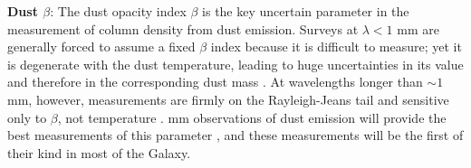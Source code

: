 \documentclass[11pt,preprint]{aastex_nofoot}
\begin{document}

\textbf{Dust $\beta$}:
The dust opacity index $\beta$ is the key uncertain parameter in the
measurement of column density from dust emission.  Surveys at $\lambda<1$ mm
are generally forced to assume a fixed $\beta$ index because it is difficult to
measure; yet it is degenerate with the dust temperature, leading to huge
uncertainties in its value and therefore in the corresponding dust mass
\citep[e.g.,][]{Juvela2012a}.  At wavelengths longer than $\sim1$ mm, however,
measurements are firmly on the Rayleigh-Jeans tail and sensitive only to
$\beta$, not temperature \citep[e.g.,][]{Rigby2018a}.   mm
observations of dust emission will provide the best measurements of this
parameter \citep{Schnee2014b}, and these measurements will be the first of
their kind in most of the Galaxy.


\end{document}
